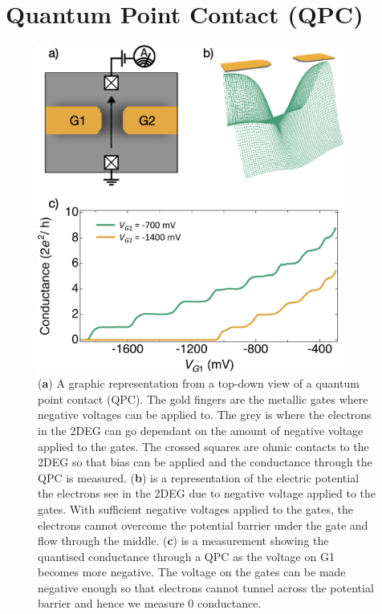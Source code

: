 \section{Quantum Point Contact (QPC)}


\begin{figure}[ht]
  \begin{center}
    \includegraphics[width=0.9\textwidth]{figures/ch1/crop_PosterFiguresMaster.002.png}
    \caption[Conductance through a quantum point contact]{\label{fig:ch1/qpc_intro} 
    (\textbf{a}) A graphic representation from a top-down view of a quantum point contact (QPC). The gold fingers are the metallic gates where negative voltages can be applied to. The grey is where the electrons in the 2DEG can go dependant on the amount of negative voltage applied to the gates. The crossed squares are ohmic contacts to the 2DEG so that bias can be applied and the conductance through the QPC is measured. (\textbf{b}) is a representation of the electric potential the electrons see in the 2DEG due to negative voltage applied to the gates. With sufficient negative voltages applied to the gates, the electrons cannot overcome the potential barrier under the gate and flow through the middle. (\textbf{c}) is a measurement showing the quantised conductance through a QPC as the voltage on G1 becomes more negative. The voltage on the gates can be made negative enough so that electrons cannot tunnel across the potential barrier and hence we measure 0 conductance. 
      }
  \end{center}
\end{figure}



